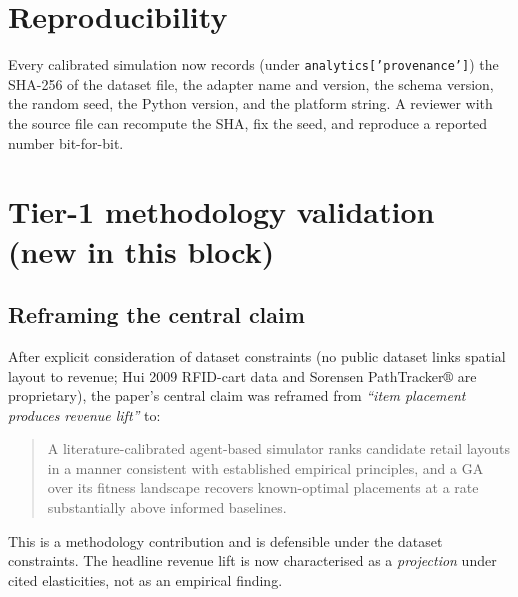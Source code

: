 \documentclass[11pt]{article}
\begin{document}
\section{Reproducibility}
\label{sec:repro}

Every calibrated simulation now records (under
\texttt{analytics['provenance']}) the SHA-256 of the dataset file,
the adapter name and version, the schema version, the random seed,
the Python version, and the platform string. A reviewer with the
source file can recompute the SHA, fix the seed, and reproduce a
reported number bit-for-bit.

\section{Tier-1 methodology validation (new in this block)}
\label{sec:tier1}

\subsection{Reframing the central claim}
After explicit consideration of dataset constraints (no public dataset
links spatial layout to revenue; Hui 2009 RFID-cart data and Sorensen
PathTracker$\circledR$ are proprietary), the paper's central claim was
reframed from \emph{``item placement produces revenue lift''} to:

\begin{quote}
A literature-calibrated agent-based simulator ranks candidate retail
layouts in a manner consistent with established empirical principles,
and a GA over its fitness landscape recovers known-optimal placements
at a rate substantially above informed baselines.
\end{quote}

This is a methodology contribution and is defensible under the
dataset constraints. The headline revenue lift is now characterised
as a \emph{projection} under cited elasticities, not as an empirical
finding.
\end{document}
